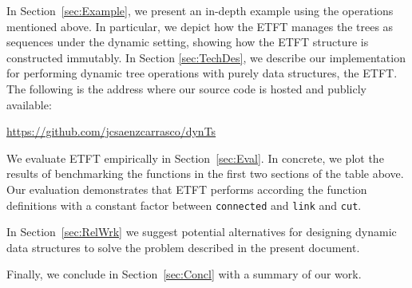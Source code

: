 In Section~\ref{sec:Example}, we present an in-depth example using the operations mentioned above. In particular, we depict how the ETFT manages the trees as sequences under the dynamic setting, showing how the ETFT structure is constructed immutably. In Section \ref{sec:TechDes}, we describe our implementation for performing dynamic tree operations with purely data structures, the ETFT. The following is the address where our source code is hosted and publicly available:
\begin{center}
\url{https://github.com/jcsaenzcarrasco/dynTs}
\end{center}

We evaluate ETFT empirically in Section~\ref{sec:Eval}. In concrete, we plot the results of benchmarking the functions in the first two sections of the table above. Our evaluation demonstrates that ETFT performs according the function definitions with a constant factor between \texttt{connected} and \texttt{link} and \texttt{cut}. 

In Section~\ref{sec:RelWrk} we suggest potential alternatives for designing dynamic data structures to solve the problem described in the present document. 

Finally, we conclude in Section~\ref{sec:Concl} with a summary of our work.



